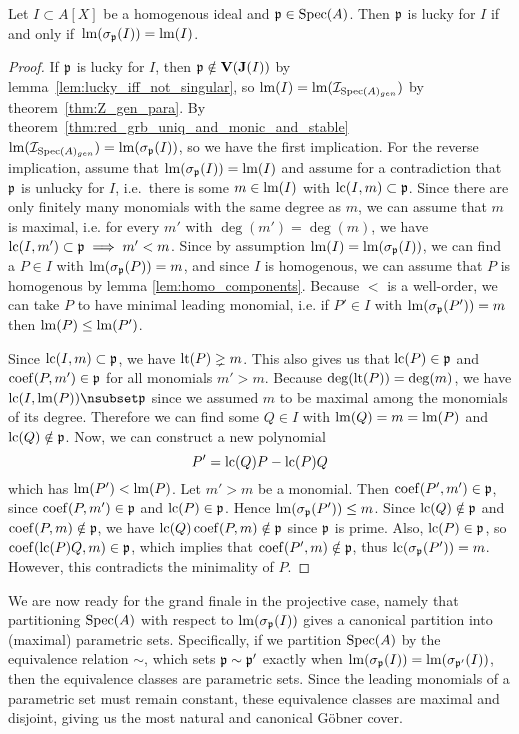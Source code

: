 \begin{theorem}\label{thm:homo_lucky_iff_lm}
  Let $I \subset A[X]$ be a homogenous ideal and $\mathfrak p \in \operatorname{Spec}(A)$. Then $\mathfrak p$ is lucky for $I$ if and only if $\,\operatorname{lm}(\sigma_{\mathfrak p}(I)) = \operatorname{lm}(I)$.
\end{theorem}
\begin{proof}
  If $\mathfrak p$ is lucky for $I$, then $\mathfrak p \notin \operatorname{\mathbf V}(\operatorname{\mathbf J}(I))$ by lemma~\ref{lem:lucky_iff_not_singular}, so $\operatorname{lm}(I) = \operatorname{lm}(\mathcal I_{\operatorname{Spec}(A)_{gen}})$ by theorem~\ref{thm:Z_gen_para}. By theorem~\ref{thm:red_grb_uniq_and_monic_and_stable} $\operatorname{lm}(\mathcal I_{\operatorname{Spec}(A)_{gen}}) = \operatorname{lm}(\sigma_{\mathfrak p}(I))$, so we have the first implication. For the reverse implication, assume that $\operatorname{lm}(\sigma_{\mathfrak p}(I)) = \operatorname{lm}(I)$ and assume for a contradiction that $\mathfrak p$ is unlucky for $I$, i.e.\ there is some $m \in \operatorname{lm}(I)$ with $\operatorname{lc}(I, m) \subset \mathfrak p$. Since there are only finitely many monomials with the same degree as $m$, we can assume that $m$ is maximal, i.e. for every $m'$ with $\deg(m') = \deg(m)$, we have $\operatorname{lc}(I, m') \subset \mathfrak p \implies m' < m$. Since by assumption $\operatorname{lm}(I) = \operatorname{lm}(\sigma_{\mathfrak p}(I))$, we can find a $P \in I$ with $\operatorname{lm}(\sigma_{\mathfrak p}(P)) = m$, and since $I$ is homogenous, we can assume that $P$ is homogenous by lemma \ref{lem:homo_components}. Because $<$ is a well-order, we can take $P$ to have minimal leading monomial, i.e. if $P' \in I$ with $\operatorname{lm}(\sigma_{\mathfrak p}(P')) = m$ then $\operatorname{lm}(P) \leq \operatorname{lm}(P')$.

  Since $\operatorname{lc}(I, m) \subset \mathfrak p$, we have $\operatorname{lt}(P) \gneq m$. This also gives us that $\operatorname{lc}(P) \in \mathfrak p$ and $\operatorname{coef}(P, m') \in \mathfrak p$ for all monomials $m' > m$. Because $\deg(\operatorname{lt}(P)) = \deg(m)$, we have $\LC(I, \LM(P)) \nsubset \p$ since we assumed $m$ to be maximal among the monomials of its degree. Therefore we can find some $Q \in I$ with $\operatorname{lm}(Q) = m = \operatorname{lm}(P)$ and $\operatorname{lc}(Q) \notin \mathfrak p$. Now, we can construct a new polynomial
  \[P' = \operatorname{lc}(Q)P - \operatorname{lc}(P) Q\]
  which has $\operatorname{lm}(P') < \operatorname{lm}(P)$. Let $m' > m$ be a monomial. Then $\operatorname{coef}(P', m') \in \mathfrak p$, since $\operatorname{coef}(P, m') \in \mathfrak p$ and $\operatorname{lc}(P) \in \mathfrak p$. Hence $\operatorname{lm}(\sigma_{\mathfrak p}(P')) \leq m$. Since $\operatorname{lc}(Q) \notin \mathfrak p$ and $\operatorname{coef}(P, m) \notin \mathfrak p$, we have $\operatorname{lc}(Q)\operatorname{coef}(P, m) \notin \mathfrak p$ since $\mathfrak p$ is prime. Also, $\operatorname{lc}(P) \in \mathfrak p$, so $\operatorname{coef}(\operatorname{lc}(P)Q, m) \in \mathfrak p$, which implies that $\operatorname{coef}(P', m) \notin \mathfrak p$, thus $\operatorname{lc}(\sigma_{\mathfrak p}(P')) = m$. However, this contradicts the minimality of $P$.
\end{proof}

We are now ready for the grand finale in the projective case, namely that partitioning $\operatorname{Spec}(A)$ with respect to $\operatorname{lm}(\sigma_{\mathfrak p}(I))$ gives a canonical partition into (maximal) parametric sets. Specifically, if we partition $\operatorname{Spec}(A)$ by the equivalence relation $\sim$, which sets $\mathfrak p \sim \mathfrak p'$ exactly when $\operatorname{lm}(\sigma_{\mathfrak p}(I)) = \operatorname{lm}(\sigma_{\mathfrak p'}(I))$, then the equivalence classes are parametric sets. Since the leading monomials of a parametric set must remain constant, these equivalence classes are maximal and disjoint, giving us the most natural and canonical Göbner cover.

